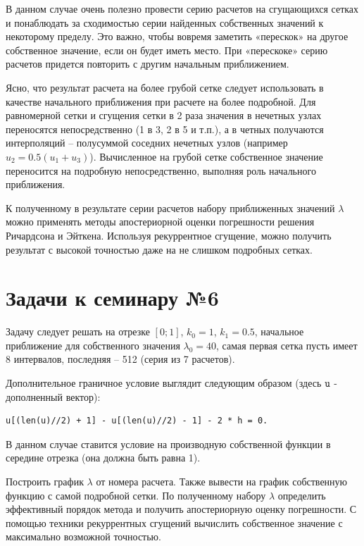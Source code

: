 \documentclass{article}
\begin{document}
В данном случае очень полезно провести серию расчетов на сгущающихся сетках и понаблюдать за сходимостью серии найденных собственных значений к некоторому пределу. Это важно, чтобы вовремя заметить «перескок» на другое собственное значение, если он будет иметь место. При «перескоке» серию расчетов придется повторить с другим начальным приближением.

Ясно, что результат расчета на более грубой сетке следует использовать в качестве начального приближения при расчете на более подробной. Для равномерной сетки и сгущения сетки в 2 раза значения в нечетных узлах переносятся непосредственно (1 в 3, 2 в 5 и т.п.), а в четных получаются интерполяций – полусуммой соседних нечетных узлов (например $u_2 = 0.5(u_1+u_3)$). Вычисленное на грубой сетке собственное значение переносится на подробную непосредственно, выполняя роль начального приближения.

К полученному в результате серии расчетов набору приближенных значений $\lambda$ можно применять методы апостериорной оценки погрешности решения Ричардсона и Эйткена. Используя рекуррентное сгущение, можно получить результат с высокой точностью даже на не слишком подробных сетках. 

\section*{Задачи к семинару №6}
Задачу следует решать на отрезке $[0; 1]$, $k_0 = 1$, $k_1 = 0.5$, начальное приближение для собственного значения $\lambda_0 = 40$, самая первая сетка пусть имеет 8 интервалов, последняя – 512  (серия из 7 расчетов). 

Дополнительное граничное условие выглядит следующим образом (здесь $\texttt{\lstinline|u|}$ - дополненный вектор):
\begin{verbatim}
u[(len(u)//2) + 1] - u[(len(u)//2) - 1] - 2 * h = 0.
\end{verbatim}
В данном случае ставится условие на производную собственной функции в середине отрезка (она должна быть равна 1).

Построить график $\lambda$ от номера расчета. Также вывести на график собственную функцию с самой подробной сетки. По полученному набору $\lambda$ определить эффективный порядок метода и получить апостериорную оценку погрешности. С помощью техники рекуррентных сгущений вычислить собственное значение с максимально возможной точностью.
\end{document}
